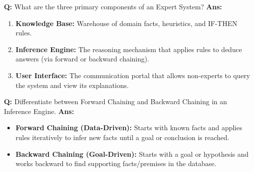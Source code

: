 \documentclass[10pt,a4paper,twocolumn]{article}
\begin{document}
\begin{tcolorbox}[
  colback=white,
  colframe=UnitColorOne,
  colbacktitle=gray!10!white,
  coltitle=black,
  fonttitle=\bfseries\sffamily\small,
  title={Unit I $\bullet$ Card 5: Core Components of an Expert System},
  boxrule=1.2pt,
  arc=2mm,
  outer arc=2mm,
  boxsep=1.5mm,
  top=1mm,
  bottom=1mm,
  left=1.5mm,
  right=1.5mm,
  before skip=2.5mm,
  after skip=2.5mm
]
\textbf{Q:} What are the three primary components of an Expert System?
\tcbline
\textbf{Ans:} \begin{enumerate}
  \item \textbf{Knowledge Base:} Warehouse of domain facts, heuristics, and IF-THEN rules.
  \item \textbf{Inference Engine:} The reasoning mechanism that applies rules to deduce answers (via forward or backward chaining).
  \item \textbf{User Interface:} The communication portal that allows non-experts to query the system and view its explanations.
\end{enumerate}
\end{tcolorbox}


\begin{tcolorbox}[
  colback=white,
  colframe=UnitColorOne,
  colbacktitle=gray!10!white,
  coltitle=black,
  fonttitle=\bfseries\sffamily\small,
  title={Unit I $\bullet$ Card 6: Forward vs. Backward Chaining},
  boxrule=1.2pt,
  arc=2mm,
  outer arc=2mm,
  boxsep=1.5mm,
  top=1mm,
  bottom=1mm,
  left=1.5mm,
  right=1.5mm,
  before skip=2.5mm,
  after skip=2.5mm
]
\textbf{Q:} Differentiate between Forward Chaining and Backward Chaining in an Inference Engine.
\tcbline
\textbf{Ans:} \begin{itemize}
  \item   \textbf{Forward Chaining (Data-Driven):} Starts with known facts and applies rules iteratively to infer new facts until a goal or conclusion is reached.
  \item   \textbf{Backward Chaining (Goal-Driven):} Starts with a goal or hypothesis and works backward to find supporting facts/premises in the database.
\end{itemize}
\end{tcolorbox}
\end{document}
